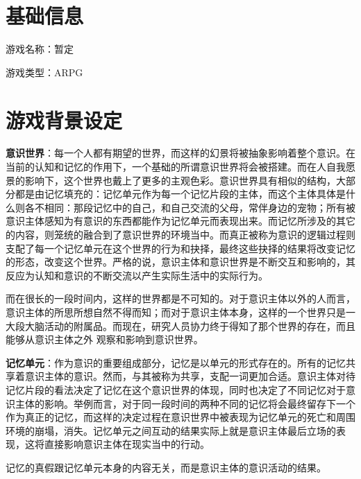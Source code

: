 \documentclass[12pt, a4paper]{article}
\begin{document}
    \section*{基础信息}
    游戏名称：暂定

    游戏类型：ARPG
    \newpage 

    \section*{游戏背景设定}
        

        \textbf{意识世界}：每一个人都有期望的世界，而这样的幻景将被抽象影响着整个意识。在当前的认知和记忆的作用下，一个基础的所谓意识世界将会被搭建。而在人自我愿景的影响下，这个世界也戴上了更多的主观色彩。意识世界具有相似的结构，大部分都是由记忆填充的：记忆单元作为每一个记忆片段的主体，而这个主体具体是什么则各不相同：那段记忆中的自己，和自己交流的父母，常伴身边的宠物；所有被意识主体感知为有意识的东西都能作为记忆单元而表现出来。而记忆所涉及的其它的内容，则笼统的融合到了意识世界的环境当中。而真正被称为意识的逻辑过程则支配了每一个记忆单元在这个世界的行为和抉择，最终这些抉择的结果将改变记忆的形态，改变这个世界。严格的说，意识主体和意识世界是不断交互和影响的，其反应为认知和意识的不断交流以产生实际生活中的实际行为。 
        
       而在很长的一段时间内，这样的世界都是不可知的。对于意识主体以外的人而言，意识主体的所思所想自然不得而知；而对于意识主体本身，这样的一个世界只是一大段大脑活动的附属品。而现在，研究人员协力终于得知了那个世界的存在，而且能够从意识主体之外
        观察和影响到意识世界。 

        \medskip
        \textbf{记忆单元}：作为意识的重要组成部分，记忆是以单元的形式存在的。所有的记忆共享着意识主体的意识。然而，与其被称为共享，支配一词更加合适。意识主体对待记忆片段的看法决定了记忆在这个意识世界的体现，同时也决定了不同记忆对于意识主体的影响。举例而言，对于同一段时间的两种不同的记忆将会最终留存下一个作为真正的记忆，而这样的决定过程在意识世界中被表现为记忆单元的死亡和周围环境的崩塌，消失。记忆单元之间互动的结果实际上就是意识主体最后立场的表现，这将直接影响意识主体在现实当中的行动。 

        记忆的真假跟记忆单元本身的内容无关，而是意识主体的意识活动的结果。
\end{document}

